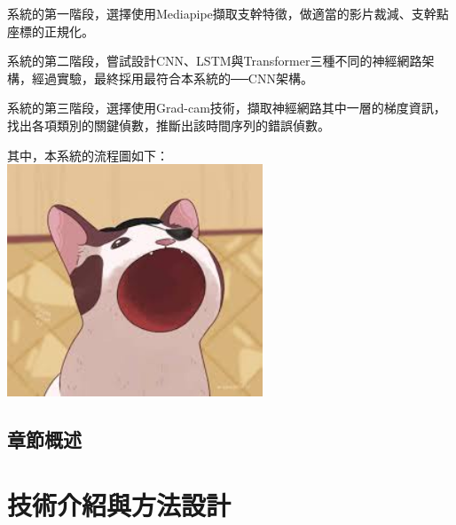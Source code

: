 \documentclass[12pt,a4paper]{report}
\begin{document}
\begin{CJK*}{UTF8}{bkai}
    \par
    系統的第一階段，選擇使用Mediapipe擷取支幹特徵，做適當的影片裁減、支幹點座標的正規化。

    \par
    系統的第二階段，嘗試設計CNN、LSTM與Transformer三種不同的神經網路架構，經過實驗，最終採用最符合本系統的──CNN架構。

    \par
    系統的第三階段，選擇使用Grad-cam技術，擷取神經網路其中一層的梯度資訊，找出各項類別的關鍵偵數，推斷出該時間序列的錯誤偵數。

    \par
    其中，本系統的流程圖如下：\\
    \includegraphics[width=3in]{demo.jpg}

    \section{章節概述}
    \par

    \chapter{技術介紹與方法設計}

\end{CJK*}
\end{document}
